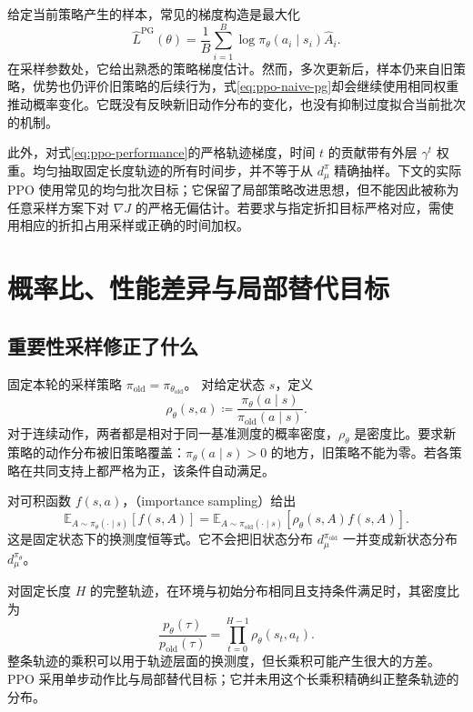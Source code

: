 \documentclass[UTF8]{ctexart}
\begin{document}
给定当前策略产生的样本，常见的梯度构造是最大化
\begin{equation}
  \widehat L^{\mathrm{PG}}(\theta)
  =\frac1B\sum_{i=1}^{B}
  \log\pi_\theta(a_i\mid s_i)\widehat A_i.
  \label{eq:ppo-naive-pg}
\end{equation}
在采样参数处，它给出熟悉的策略梯度估计。然而，多次更新后，样本仍来自旧策略，优势也仍评价旧策略的后续行为，式\eqref{eq:ppo-naive-pg}却会继续使用相同权重推动概率变化。它既没有反映新旧动作分布的变化，也没有抑制过度拟合当前批次的机制。

此外，对式\eqref{eq:ppo-performance}的严格轨迹梯度，时间 $t$ 的贡献带有外层 $\gamma^t$ 权重。均匀抽取固定长度轨迹的所有时间步，并不等于从 $d^\pi_\mu$ 精确抽样。下文的实际 PPO 使用常见的均匀批次目标；它保留了局部策略改进思想，但不能因此被称为任意采样方案下对 $\nabla J$ 的严格无偏估计。若要求与指定折扣目标严格对应，需使用相应的折扣占用采样或正确的时间加权。

\section{概率比、性能差异与局部替代目标}
\label{sec:ppo-surrogate}

\subsection{重要性采样修正了什么}

固定本轮的采样策略 $\pi_{\mathrm{old}}=\pi_{\theta_{\mathrm{old}}}$。
对给定状态 $s$，定义
\begin{equation}
  \rho_\theta(s,a)
  \coloneqq\frac{\pi_\theta(a\mid s)}
                 {\pi_{\mathrm{old}}(a\mid s)}.
  \label{eq:ppo-ratio}
\end{equation}
对于连续动作，两者都是相对于同一基准测度的概率密度，$\rho_\theta$ 是密度比。要求新策略的动作分布被旧策略覆盖：$\pi_\theta(a\mid s)>0$ 的地方，旧策略不能为零。若各策略在共同支持上都严格为正，该条件自动满足。

对可积函数 $f(s,a)$，（importance sampling）给出
\begin{equation}
  \mathbb E_{A\sim\pi_\theta(\cdot\mid s)}[f(s,A)]
  =\mathbb E_{A\sim\pi_{\mathrm{old}}(\cdot\mid s)}
   [\rho_\theta(s,A)f(s,A)].
  \label{eq:ppo-is}
\end{equation}
这是固定状态下的换测度恒等式。它不会把旧状态分布
$d^{\pi_{\mathrm{old}}}_\mu$ 一并变成新状态分布
$d^{\pi_\theta}_\mu$。

对固定长度 $H$ 的完整轨迹，在环境与初始分布相同且支持条件满足时，其密度比为
\[
  \frac{p_\theta(\tau)}{p_{\mathrm{old}}(\tau)}
  =\prod_{t=0}^{H-1}\rho_\theta(s_t,a_t).
\]
整条轨迹的乘积可以用于轨迹层面的换测度，但长乘积可能产生很大的方差。PPO 采用单步动作比与局部替代目标；它并未用这个长乘积精确纠正整条轨迹的分布。
\end{document}
